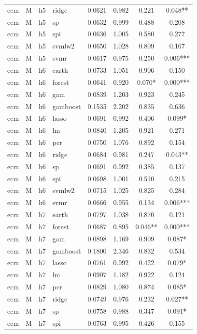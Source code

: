 \begin{ThreePartTable}
\begin{longtable}[t]{llclcccc}
ecm & M & h5 & ridge & 0.0621 & 0.982 & 0.221 & 0.048**\\
ecm & M & h5 & sp & 0.0632 & 0.999 & 0.488 & 0.208\\
ecm & M & h5 & spi & 0.0636 & 1.005 & 0.580 & 0.277\\
ecm & M & h5 & svmlw2 & 0.0650 & 1.028 & 0.809 & 0.167\\
ecm & M & h5 & svmr & 0.0617 & 0.975 & 0.250 & 0.006***\\
\addlinespace
ecm & M & h6 & earth & 0.0733 & 1.051 & 0.906 & 0.150\\
ecm & M & h6 & forest & 0.0641 & 0.920 & 0.070* & 0.000***\\
ecm & M & h6 & gam & 0.0839 & 1.203 & 0.923 & 0.245\\
ecm & M & h6 & gamboost & 0.1535 & 2.202 & 0.835 & 0.636\\
ecm & M & h6 & lasso & 0.0691 & 0.992 & 0.406 & 0.099*\\
ecm & M & h6 & lm & 0.0840 & 1.205 & 0.921 & 0.271\\
ecm & M & h6 & pcr & 0.0750 & 1.076 & 0.892 & 0.154\\
ecm & M & h6 & ridge & 0.0684 & 0.981 & 0.247 & 0.043**\\
ecm & M & h6 & sp & 0.0691 & 0.992 & 0.385 & 0.137\\
ecm & M & h6 & spi & 0.0698 & 1.001 & 0.510 & 0.215\\
ecm & M & h6 & svmlw2 & 0.0715 & 1.025 & 0.825 & 0.284\\
ecm & M & h6 & svmr & 0.0666 & 0.955 & 0.134 & 0.006***\\
\addlinespace
ecm & M & h7 & earth & 0.0797 & 1.038 & 0.870 & 0.121\\
ecm & M & h7 & forest & 0.0687 & 0.895 & 0.046** & 0.000***\\
ecm & M & h7 & gam & 0.0898 & 1.169 & 0.909 & 0.087*\\
ecm & M & h7 & gamboost & 0.1800 & 2.346 & 0.832 & 0.534\\
ecm & M & h7 & lasso & 0.0761 & 0.992 & 0.422 & 0.079*\\
ecm & M & h7 & lm & 0.0907 & 1.182 & 0.922 & 0.124\\
ecm & M & h7 & pcr & 0.0829 & 1.080 & 0.874 & 0.085*\\
ecm & M & h7 & ridge & 0.0749 & 0.976 & 0.232 & 0.027**\\
ecm & M & h7 & sp & 0.0758 & 0.988 & 0.347 & 0.091*\\
ecm & M & h7 & spi & 0.0763 & 0.995 & 0.426 & 0.155\\

\end{longtable}
\end{ThreePartTable}

